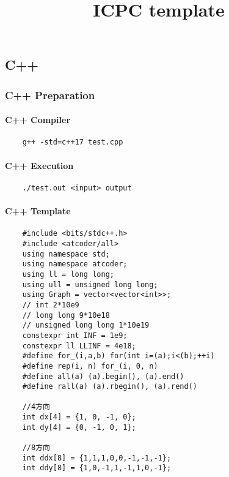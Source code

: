 \documentclass[a4paper, landscape, 9pt]{jarticle} %
\title{\vspace{-4ex}\huge{ICPC template}} %
\author{} %
\date{} %
\begin{document}
\begin{multicols*}{3} %
    \maketitle
    \vspace{-25mm}
    \tableofcontents

    \newpage

    \part{C++}

    \section{C++ Preparation}
    \subsection{C++ Compiler}
    \begin{lstlisting}
    g++ -std=c++17 test.cpp
    \end{lstlisting}

    \subsection{C++ Execution}
    \begin{lstlisting}
    ./test.out <input> output
    \end{lstlisting}

    \subsection{C++ Template}
    \begin{lstlisting}
    #include <bits/stdc++.h>
    #include <atcoder/all>
    using namespace std;
    using namespace atcoder;
    using ll = long long;
    using ull = unsigned long long;
    using Graph = vector<vector<int>>;
    // int 2*10e9
    // long long 9*10e18
    // unsigned long long 1*10e19
    constexpr int INF = 1e9;
    constexpr ll LLINF = 4e18;
    #define for_(i,a,b) for(int i=(a);i<(b);++i)
    #define rep(i, n) for_(i, 0, n)
    #define all(a) (a).begin(), (a).end()
    #define rall(a) (a).rbegin(), (a).rend()

    //4方向
    int dx[4] = {1, 0, -1, 0};
    int dy[4] = {0, -1, 0, 1};

    //8方向
    int ddx[8] = {1,1,1,0,0,-1,-1,-1}; 
    int ddy[8] = {1,0,-1,1,-1,1,0,-1};


\end{lstlisting}
\end{multicols*}
\end{document}
